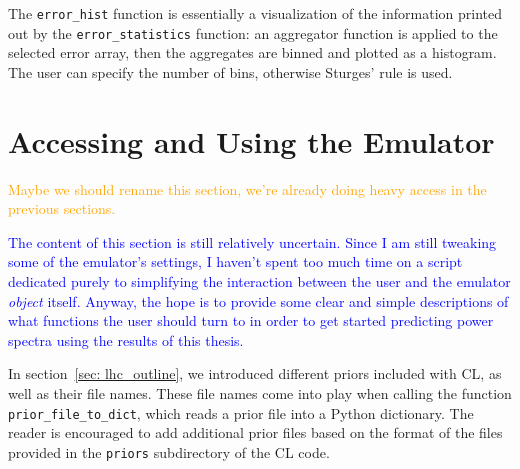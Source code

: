 The \verb|error_hist| function is essentially a visualization of the 
information printed out by the \verb|error_statistics| function: an aggregator
function is applied to the selected error array, then the aggregates are 
binned and plotted as a histogram. The user can specify the number of bins,
otherwise Sturges' rule is used.


\section{Accessing and Using the Emulator}


\textcolor{orange}{Maybe we should rename this section, we're already doing
heavy access in the previous sections.}

\textcolor{blue}{The content of this section is still relatively uncertain. 
Since I am still tweaking some of the emulator's settings, I haven't spent too 
much time on a script dedicated purely to simplifying the interaction between 
the user and the emulator \textit{object} itself. Anyway, the hope is to 
provide some clear and simple 
descriptions of what functions the user should turn to in order to get started 
predicting power spectra using the results of this thesis.}


In section~\ref{sec: lhc_outline}, we introduced different priors 
included with CL, as well as their file names. These file names come into play 
when calling the function \verb|prior_file_to_dict|, which reads a prior file
into a Python dictionary. The reader is encouraged to add additional prior
files based on the format of the files provided in the \verb|priors|
subdirectory of the CL code.

